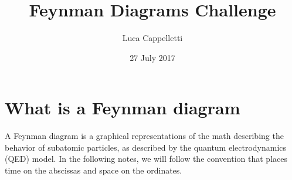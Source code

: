 \documentclass{article}
\title{Feynman Diagrams Challenge}
\author{Luca Cappelletti}
\date{27 July 2017}
\begin{document}
\maketitle

\vspace{2em}

{\hypersetup{hidelinks}
\tableofcontents
}

\newpage

\section{What is a Feynman diagram}
A Feynman diagram is a graphical representations of the math describing the behavior of subatomic particles, as described by the quantum electrodynamics (QED) model. In the following notes, we will follow the convention that places time on the abscissas and space on the ordinates.
\end{document}
